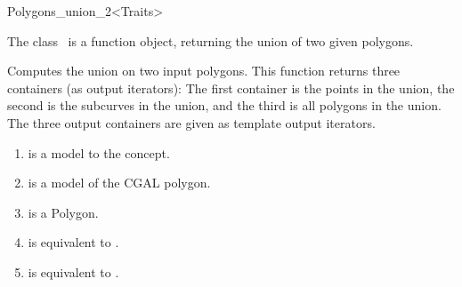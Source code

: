 
\ccRefPageBegin



\begin{ccRefFunctionObjectClass}{Polygons_union_2<Traits>}
\label{OVL_sec:polygon_union}
    
\ccDefinition
The class \ccClassTemplateName\ is a function object,
returning the union of two given polygons.



{Computes the union on two input polygons.
This function returns three containers (as output iterators):
The first container is the points in the union, 
the second is the subcurves in the union,
and the third is all polygons in the union.
The three output containers are given as template 
output iterators.
}


\begin{enumerate}
   \item
    is a model to the  concept.
   \item
    is a model of the CGAL polygon.
   \item
    is a Polygon.
   \item    
    is equivalent to .
   \item
    is equivalent to .
\end{enumerate}


\end{ccRefFunctionObjectClass}
